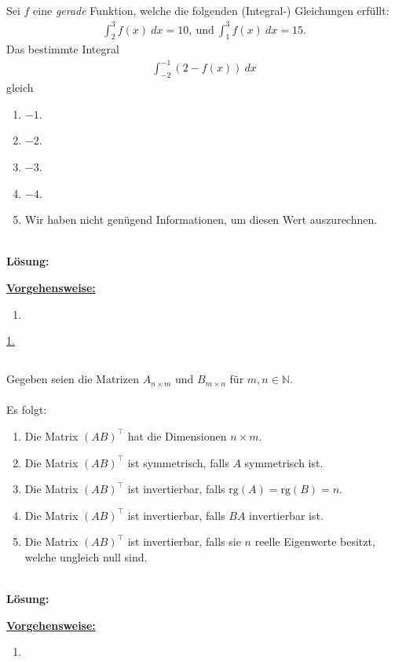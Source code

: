 \subsection*{}
Sei $ f $ eine \textit{gerade} Funktion, welche die folgenden (Integral-) Gleichungen erfüllt:
\begin{align*}
	\int_{2}^3 f(x) \ dx = 10, \ \textrm{und} \
	\int_1^3 f(x) \ dx = 15.
\end{align*}
Das bestimmte Integral
\begin{align*}
	\int_{-2}^{-1} (2 - f(x) ) \ dx
\end{align*}  
gleich
\renewcommand{\labelenumi}{(\alph{enumi})}
\begin{enumerate}
	\item 
	$ -1 $.
	\item
	$ -2 $.
	\item
	$ -3 $.
	\item
	$ -4 $.
	\item
	Wir haben nicht genügend Informationen, um diesen Wert auszurechnen.
\end{enumerate}
\ \\
\textbf{Lösung:}
\begin{mdframed}
\underline{\textbf{Vorgehensweise:}}
\renewcommand{\labelenumi}{\theenumi.}
\begin{enumerate}
\item 
\end{enumerate}
\end{mdframed}

\underline{1. }\\

\newpage
\subsection*{}
Gegeben seien die Matrizen $ A_{n \times m} $ und $ B_{m \times n} $ für $ m,n \in \mathbb{N} $.\\
\\
Es folgt:
\renewcommand{\labelenumi}{(\alph{enumi})}
\begin{enumerate}
	\item 
	Die Matrix $ (AB)^\top $ hat die Dimensionen $ n \times m $.
	\item 
	Die Matrix $ (AB)^\top $ ist symmetrisch, falls $ A $ symmetrisch ist.
	\item 
	Die Matrix $ (AB)^\top $ ist invertierbar, falls $ \mathrm{rg}(A) = \mathrm{rg}(B) = n $.
	\item 
	Die Matrix $ (AB)^\top $ ist invertierbar, falls $ BA $ invertierbar ist.
	\item 
	Die Matrix $ (AB)^\top $ ist invertierbar, falls sie $ n $ reelle Eigenwerte besitzt, welche ungleich null sind.
\end{enumerate}
\ \\
\textbf{Lösung:}
\begin{mdframed}
\underline{\textbf{Vorgehensweise:}}
\renewcommand{\labelenumi}{\theenumi.}
\begin{enumerate}
\item 
\end{enumerate}
\end{mdframed}

